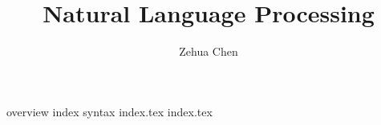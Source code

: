 \documentclass[letterpaper, 11pt]{report}
\title{Natural Language Processing}
\author{Zehua Chen}
\begin{document}
  \maketitle
  \tableofcontents

  {overview}
  {index}
  {syntax}
  {index.tex}
  {index.tex}

  \newpage
  \printglossary
\end{document}
